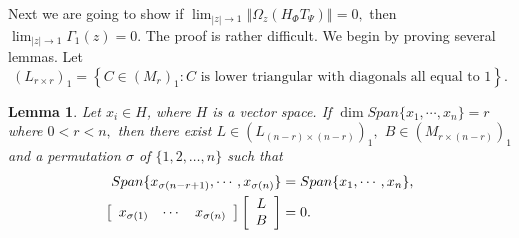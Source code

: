 \documentclass{article}%
\newtheorem{lemma}[theorem]{Lemma}
\begin{document}
Next we are going to show if $\lim_{\left\vert z\right\vert \rightarrow
1}\left\Vert \Omega_{z}(H_{\Phi}T_{\Psi})\right\Vert =0,$ then $\lim
_{\left\vert z\right\vert \rightarrow1}\Gamma_{1}(z)=0.$ The proof is rather
difficult. We begin by proving several lemmas. Let
\[
\left(  L_{r\times r}\right)  _{1}=\left\{  C\in\left(  M_{r}\right)
_{1}:C\text{ is lower triangular with diagonals all equal to }1\right\}  .
\]


\begin{lemma}
Let $x_{i}\in H$, where $H$ is a vector space. If $\dim Span\{x_{1}%
,\cdots,x_{n}\}=r$ where $0<r<n,$ then there exist $L\in\left(  L_{(n-r)\times
(n-r)}\right)  _{1},$ $B\in\left(  M_{r\times(n-r)}\right)  _{1}$ and a
permutation $\sigma$ of $\{1,2,\ldots,n\}$ such that%
\begin{align}
Span\{x_{\sigma(n-r+1)},\cdots,x_{\sigma(n)}\}  &  =Span\{x_{1},\cdots
,x_{n}\},\label{dim}\\
\left[
\begin{array}
[c]{ccc}%
x_{\sigma(1)} & \cdots & x_{\sigma(n)}%
\end{array}
\right]  \left[
\begin{array}
[c]{c}%
L\\
B
\end{array}
\right]   &  =0 . \label{bmatrix}%
\end{align}

\end{lemma}
\end{document}

